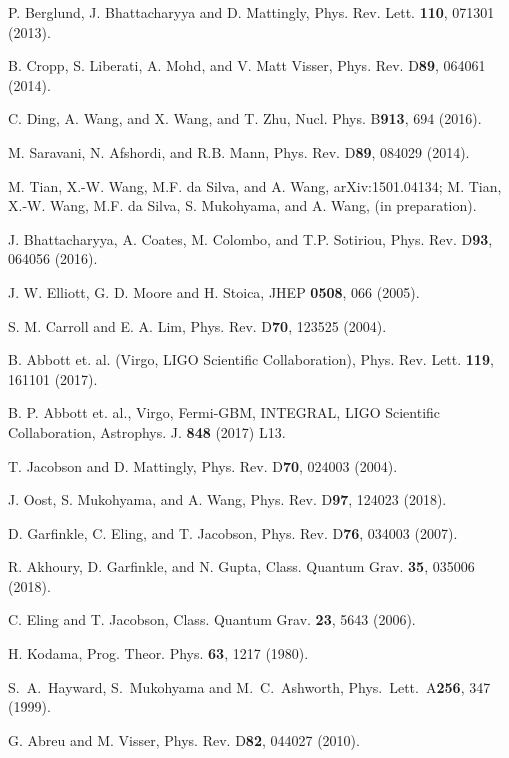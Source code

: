 \documentclass[aps,preprintnumbers,twocolumn,showpacs]{revtex4-1}
\begin{document}
\begin{thebibliography}{nbound}
  P. Berglund, J. Bhattacharyya and D. Mattingly, Phys. Rev. Lett. {\bf110},  071301 (2013).
 
   B. Cropp, S. Liberati,  A. Mohd, and V. Matt Visser, Phys. Rev. D{\bf 89},  064061 (2014).

 C. Ding, A. Wang, and X. Wang, and T. Zhu, Nucl. Phys. B{\bf 913}, 694 (2016).

 M. Saravani, N. Afshordi, and R.B. Mann, Phys. Rev. D{\bf 89},  084029 (2014).

 M. Tian, X.-W.  Wang, M.F. da Silva, and A. Wang, arXiv:1501.04134;
M. Tian, X.-W.  Wang, M.F. da Silva, S. Mukohyama, and A. Wang, (in preparation).  

 J. Bhattacharyya, A. Coates, M. Colombo, and T.P. Sotiriou, Phys. Rev. D{\bf 93}, 064056 (2016). 

  J. W. Elliott, G. D. Moore and H. Stoica,  JHEP {\bf 0508}, 066 (2005).  

 S. M. Carroll and E. A. Lim, Phys. Rev. D{\bf 70}, 123525 (2004).
 
 B. Abbott et. al. (Virgo, LIGO Scientific Collaboration),  Phys. Rev. Lett. {\bf 119}, 161101 (2017).

 B. P. Abbott et. al.,  Virgo, Fermi-GBM, INTEGRAL, LIGO Scientific Collaboration, Astrophys. J. {\bf 848} (2017) L13. 
  
 T. Jacobson and D. Mattingly, Phys. Rev. D{\bf 70}, 024003 (2004).

 J. Oost, S. Mukohyama, and A. Wang, Phys. Rev. D{\bf 97}, 124023 (2018). %
 
 D. Garfinkle, C. Eling, and T. Jacobson, Phys. Rev. D{\bf 76}, 034003 (2007).

 R. Akhoury, D. Garfinkle,  and N. Gupta, Class. Quantum Grav. {\bf 35}, 035006 (2018).

 C. Eling and T. Jacobson, Class. Quantum Grav. {\bf 23}, 5643 (2006).
    
 
 H. Kodama, Prog. Theor. Phys. {\bf 63}, 1217 (1980).

 S.~A.~Hayward, S.~Mukohyama and M.~C.~Ashworth, Phys.\ Lett.\ A{\bf 256}, 347 (1999). 

 G. Abreu and M. Visser, Phys. Rev. D{\bf 82}, 044027 (2010).

\end{thebibliography}
\end{document}
